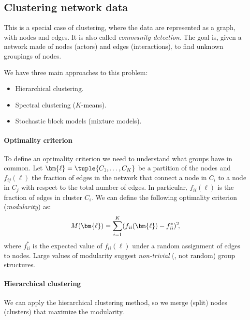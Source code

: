 \subsection{Clustering network data}

This is a special case of clustering, where the data are represented as a graph, with nodes and edges. It is also called \emph{community detection}. The goal is, given a network made of nodes (actors) and edges (interactions), to find unknown groupings of nodes.

We have three main approaches to this problem:
\begin{itemize}
    \item Hierarchical clustering.
    \item Spectral clustering ($K$\negthinspace-means).
    \item Stochastic block models (mixture models).
\end{itemize}

\paragraph{Optimality criterion} To define an optimality criterion we need to understand what groups have in common. Let $\bm{\ell} = \tuple{C_1, \dots, C_K}$ be a partition of the nodes and $f_{\mathit{ij}}(\bm{\ell})$ the fraction of edges in the network that connect a node in $C_i$ to a node in $C_j$ with respect to the total number of edges. In particular, $f_{\mathit{ii}}(\bm{\ell})$ is the fraction of edges in cluster $C_i$. We can define the following optimality criterion (\emph{modularity}) as:
\begin{equation}
    M(\bm{\ell}) = \sum_{i=1}^K (f_{\mathit{ii}}(\bm{\ell}) - f_{\mathit{ii}}^*)^2\negthinspace,
\end{equation}
where $f_{\mathit{ii}}^*$ is the expected value of $f_{\mathit{ii}}(\bm{\ell})$ under a random assignment of edges to nodes. Large values of modularity suggest \emph{non-trivial} (\ie, not random) group structures.

\paragraph{Hierarchical clustering} We can apply the hierarchical clustering method, so we merge (split) nodes (clusters) that maximize the modularity.